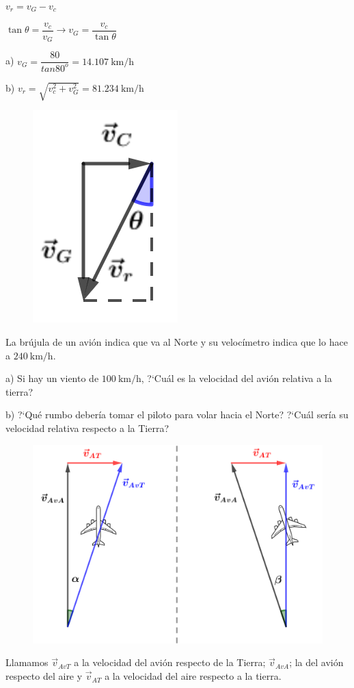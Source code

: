 \begin{multicols}{2}
	$v_r=v_G-v_c$
	
	$\tan \theta=\dfrac {v_c}{v_G} \to v_G= \dfrac{v_c}{\tan \theta}$
	
	a) $v_G=\dfrac {80}{tan 80^o}=14.107\  \mathrm{km/h}$
	
	b) $v_r=\sqrt{v_c^2+v_G^2}=81.234\  \mathrm{km/h}$
	\begin{figure}[H]
	\centering
	\includegraphics[width=.2\textwidth]{imagenes/imagenes10/T10IM07.png}
\end{figure}
\end{multicols}

\begin{prob}
La brújula de un avión indica que va al Norte y su velocímetro indica que lo hace a $240\ \mathrm{km/h}$. 

a) Si hay un viento de $100\ \mathrm{km/h}$, ?`Cuál es la velocidad del avión relativa a la tierra?

b) ?`Qué rumbo debería tomar el piloto para volar hacia el Norte? ?`Cuál sería su velocidad relativa respecto a la Tierra?
\end{prob}
\begin{figure}[H]
	\centering
	\includegraphics[width=.8\textwidth]{imagenes/imagenes10/T10IM09.png}
\end{figure}

Llamamos $\vec v_{AvT}$ a la velocidad del avión respecto de la Tierra; $\vec v_{AvA}$; la del avión respecto del aire y $\vec v_{AT}$ a la velocidad del aire respecto a la tierra.

